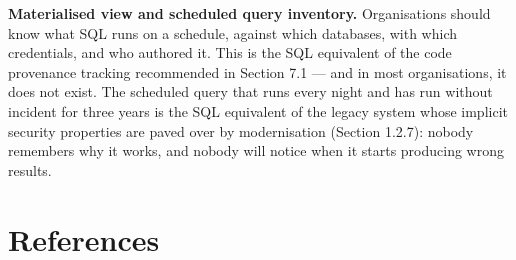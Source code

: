 \documentclass[a4paper,11pt]{report}
\begin{document}
\textbf{Materialised view and scheduled query inventory.} Organisations
should know what SQL runs on a schedule, against which databases, with
which credentials, and who authored it. This is the SQL equivalent of
the code provenance tracking recommended in Section 7.1 --- and in most
organisations, it does not exist. The scheduled query that runs every
night and has run without incident for three years is the SQL equivalent
of the legacy system whose implicit security properties are paved over
by modernisation (Section 1.2.7): nobody remembers why it works, and
nobody will notice when it starts producing wrong results.

\hypertarget{references}{%
\section{References}\label{references}}
\end{document}
